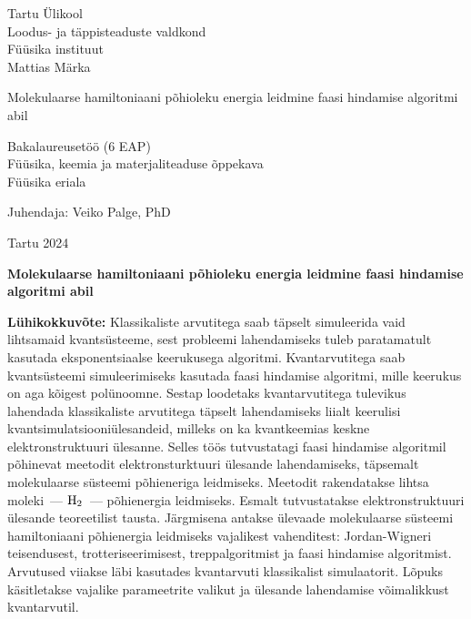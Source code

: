 \documentclass[12pt]{report}
\begin{document}
\begin{titlepage}
    \begin{center}
        \large
        {\sc Tartu Ülikool} \\
        Loodus- ja täppisteaduste valdkond \\
        Füüsika instituut \\


        \vspace{25mm}
        \Large Mattias Märka

        \vspace{4mm}
        \Huge Molekulaarse hamiltoniaani põhioleku energia leidmine faasi hindamise algoritmi abil

        \vspace{20mm}
        \Large Bakalaureusetöö (6 EAP) \\
        Füüsika, keemia ja materjaliteaduse õppekava \\
	Füüsika eriala \\

        \vspace{20mm}
        \begin{flushright}
            \Large Juhendaja: Veiko Palge, PhD
        \end{flushright}

        \vfill
        \large Tartu 2024
    \end{center}
\end{titlepage}

\newpage

\noindent\textbf{\large Molekulaarse hamiltoniaani põhioleku energia leidmine faasi hindamise algoritmi abil}

\vspace*{1ex}

\noindent\textbf{Lühikokkuvõte:}
Klassikaliste arvutitega saab täpselt simuleerida vaid lihtsamaid kvantsüsteeme, sest probleemi lahendamiseks tuleb paratamatult kasutada eksponentsiaalse keerukusega algoritmi.
Kvantarvutitega saab kvantsüsteemi simuleerimiseks kasutada faasi hindamise algoritmi, mille keerukus on aga kõigest polünoomne.
Sestap loodetaks kvantarvutitega tulevikus lahendada klassikaliste arvutitega täpselt lahendamiseks liialt keerulisi kvantsimulatsiooniülesandeid, milleks on ka kvantkeemias keskne elektronstruktuuri ülesanne.
Selles töös tutvustatagi faasi hindamise algoritmil põhinevat meetodit elektronsturktuuri ülesande lahendamiseks, täpsemalt molekulaarse süsteemi põhieneriga leidmiseks.
Meetodit rakendatakse lihtsa moleki~--- \(\rm H_2\)~--- põhienergia leidmiseks.
Esmalt tutvustatakse elektronstruktuuri ülesande teoreetilist tausta.
Järgmisena antakse ülevaade molekulaarse süsteemi hamiltoniaani põhienergia leidmiseks vajalikest vahenditest: Jordan-Wigneri teisendusest, trotteriseerimisest, treppalgoritmist ja faasi hindamise algoritmist.
Arvutused viiakse läbi kasutades kvantarvuti klassikalist simulaatorit.
Lõpuks käsitletakse vajalike parameetrite valikut ja ülesande lahendamise võimalikkust kvantarvutil.
\end{document}
